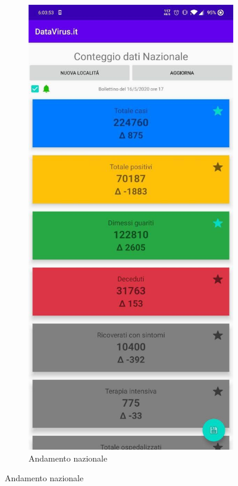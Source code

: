 \documentclass{article}
\begin{document}
\begin{figure}[h]
\begin{subfigure}{.5\textwidth}
          \includegraphics[width=.7\linewidth]{main_activity.jpg}
          \caption{Andamento nazionale}
          \label{fig:sub2}
        \end{subfigure}
        \label{fig:test}
    \end{figure}
        
\end{document}
